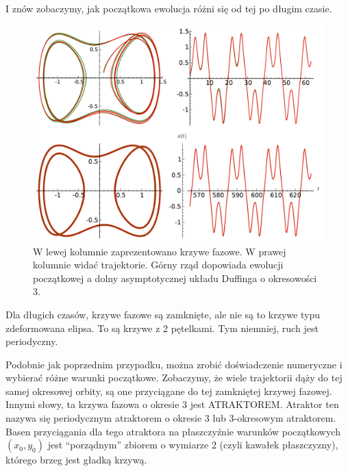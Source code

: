 \documentclass[a4paper,12pt,polish]{sphinxmanual}
\begin{document}
I znów zobaczymy, jak początkowa ewolucja różni się od tej po długim czasie.
\begin{figure}[htbp]
\centering
\capstart

\includegraphics{sage_chII011_09.pdf}
\caption{W lewej kolumnie zaprezentowano krzywe fazowe.
W prawej kolumnie widać trajektorie.
Górny rząd dopowiada ewolucji początkowej a dolny
asymptotycznej układu Duffinga o okresowości 3.}\end{figure}

Dla długich czasów, krzywe fazowe są zamknięte, ale nie są  to krzywe typu zdeformowana elipsa.  To są krzywe z 2 pętelkami. Tym niemniej, ruch jest periodyczny.

Podobnie jak poprzednim przypadku, można zrobić doświadczenie numeryczne i wybierać różne warunki początkowe. Zobaczymy, że wiele trajektorii dąży do tej samej  okresowej orbity, są one  przyciągane do tej  zamkniętej krzywej fazowej. Innymi słowy, ta krzywa fazowa o okresie 3  jest ATRAKTOREM.  Atraktor ten nazywa się periodycznym atraktorem o okresie 3 lub 3-okresowym  atraktorem.  Basen przyciągania dla tego atraktora  na płaszczyźnie warunków początkowych $(x_0, y_0)$  jest ``porządnym'' zbiorem o wymiarze 2 (czyli kawałek płaszczyzny), którego brzeg jest gładką krzywą.
\end{document}
